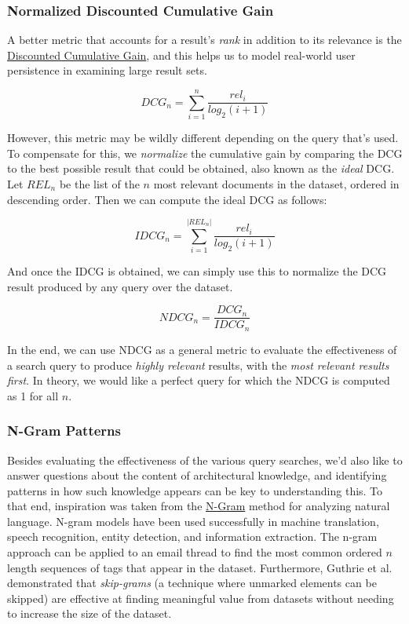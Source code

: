\documentclass[a4paper, 12pt]{article}
\begin{document}
		\subsubsection{Normalized Discounted Cumulative Gain}
			A better metric that accounts for a result's \textit{rank} in addition to its relevance is the \href{}{Discounted Cumulative Gain}, and this helps us to model real-world user persistence in examining large result sets\cite{jarvelin}.

			\begin{equation}
				\tag{DCG}
				DCG_n = \sum_{i=1}^{n} \frac{rel_i}{log_2(i + 1)}
				\label{eqn:dcg}
			\end{equation}
			
			However, this metric may be wildly different depending on the query that's used. To compensate for this, we \textit{normalize} the cumulative gain by comparing the DCG to the best possible result that could be obtained, also known as the \textit{ideal} DCG\cite{stanfordslides}. Let $ REL_n $ be the list of the $ n $ most relevant documents in the dataset, ordered in descending order. Then we can compute the ideal DCG as follows:
			
			\begin{equation}
				\tag{IDCG}
				IDCG_n = \sum_{i=1}^{|REL_n|} \frac{rel_i}{log_2(i + 1)}
				\label{eqn:idcg}
			\end{equation}
		
			And once the IDCG is obtained, we can simply use this to normalize the DCG result produced by any query over the dataset.
			
			\begin{equation}
				\tag{NDCG}
				NDCG_n = \frac{DCG_n}{IDCG_n}
				\label{eqn:ndcg}
			\end{equation}
		
			In the end, we can use NDCG as a general metric to evaluate the effectiveness of a search query to produce \textit{highly relevant} results, with the \textit{most relevant results first}. In theory, we would like a perfect query for which the NDCG is computed as 1 for all $ n $\cite{denboon}.
			
		\subsubsection{N-Gram Patterns}
			Besides evaluating the effectiveness of the various query searches, we'd also like to answer questions about the content of architectural knowledge, and identifying patterns in how such knowledge appears can be key to understanding this. To that end, inspiration was taken from the \href{https://en.wikipedia.org/wiki/N-gram}{N-Gram} method for analyzing natural language. N-gram models have been used successfully in machine translation, speech recognition, entity detection, and information extraction\cite{google-ngram}. The n-gram approach can be applied to an email thread to find the most common ordered $ n $ length sequences of tags that appear in the dataset. Furthermore, Guthrie et al. demonstrated that \textit{skip-grams} (a technique where unmarked elements can be skipped) are effective at finding meaningful value from datasets without needing to increase the size of the dataset\cite{guthrie}.
			
\end{document}
